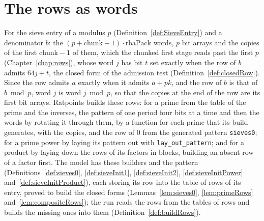 \section{The rows as words}\label{sec:wordRows}

\begin{definition}\label{def:row}
  \leanok
  For the sieve entry of a modulus $p$ (Definition~\ref{def:SieveEntry}) and a denominator $b$: the
  $(p + \mathrm{chunk} - 1) \cdot \mathrm{rbaPack}$ words, $p$ bit arrays and the copies of the
  first $\mathrm{chunk} - 1$ of them, which the chunked first stage reads past the first $p$
  (Chapter~\ref{chap:rows}), whose word $j$ has bit $t$ set exactly when the row of $b$ admits
  $64 j + t$, the closed form of the admission test (Definition~\ref{def:closedRow}). Since the row
  admits $a$ exactly when it admits $a + p k$, and the row of $b$ is that of $b \bmod p$, word $j$
  is word $j \bmod p$, so that the copies at the end of the row are its first bit arrays. Ratpoints
  builds these rows: for a prime from the table of the prime and the inverses, the pattern of one
  period four bits at a time and then the words by rotating it through them, by a function for each
  prime that its build generates, with the copies, and the row of $0$ from the generated pattern
  \verb|sieves0|; for a prime power by laying its pattern out with \verb|lay_out_pattern|; and for a
  product by laying down the rows of its factors in blocks, building an absent row of a factor
  first. The model has these builders and the pattern (Definitions~\ref{def:sieves0},
  \ref{def:sieveInit1}, \ref{def:sieveInit2}, \ref{def:sieveInitPower}
  and~\ref{def:sieveInitProduct}), each storing its row into the table of rows of its entry, proved
  to build the closed forms (Lemmas~\ref{lem:sieves0}, \ref{lem:primeRows}
  and~\ref{lem:compositeRows}); the run reads the rows from the tables of rows and builds the
  missing ones into them (Definition~\ref{def:buildRows}).
\end{definition}

